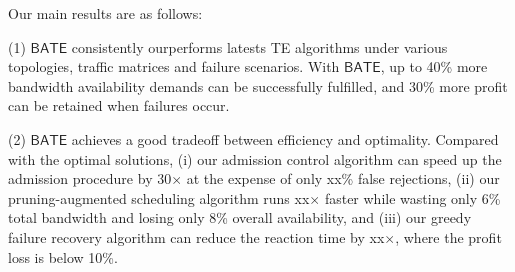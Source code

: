 \documentclass[sigconf]{acmart}
\begin{document}
Our main results are as follows:

(1) $\mathsf{BATE}$ consistently ourperforms latests TE algorithms under various topologies, traffic matrices and failure scenarios. With $\mathsf{BATE}$, up to 40\% more bandwidth availability demands can be successfully fulfilled, and 30\% more profit can be retained when failures occur.

(2) $\mathsf{BATE}$ achieves a good tradeoff between efficiency and optimality. 
Compared with the optimal solutions, (i) our admission control algorithm can speed up the admission procedure by 30$\times$ at the expense of only xx\% false rejections, 
(ii) our pruning-augmented scheduling algorithm runs xx$\times$ faster while wasting only 6\% total bandwidth and losing only 8\% overall availability, 
and (iii) our greedy failure recovery algorithm can reduce the reaction time by xx$\times$, 
where the profit loss is below 10\%.

\end{document}
